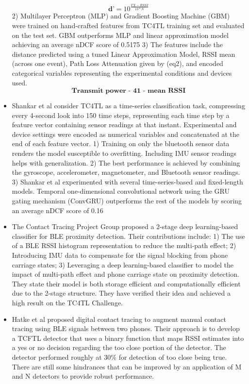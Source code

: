 \documentclass[conference]{IEEEtran}
\begin{document}
\begin{itemize}
\begin{equation} \label{distance_estimate}
{\mathbf{\textbf{d'}} =10^{\frac{{TX - RSSI}}{10*N}}}
\end{equation}
2) Multilayer Perceptron (MLP) and Gradient Boosting Machine (GBM) were trained on hand-crafted features from TC4TL training set and evaluated on the test set. GBM outperforms MLP and linear approximation model achieving an average nDCF score of 0.5175
3) The features include the distance predicted using a tuned Linear Approximation Model, RSSI mean (across one event), Path Loss Attenuation given by (eq2), and encoded categorical variables representing the experimental conditions and devices used.\\ 
\begin{equation} \label{transmit}
{\mathbf{\textbf{Transmit power - 41 - mean RSSI}}}
\end{equation}
\item Shankar et al consider TC4TL as a time-series classification task, compressing every 4-second look into 150 time steps, representing each time step by a feature vector containing sensor readings at that instant. Experimental and device settings were encoded as numerical variables and concatenated at the end of each feature vector. 1) Training on only the bluetooth sensor data renders the model susceptible to overfitting. Including IMU sensor readings helps with generalization. 2) The best performance is achieved by combining the gyroscope, accelerometer, magnetometer, and Bluetooth sensor readings. 3) Shankar et al experimented with several time-series-based and fixed-length models. Temporal one-dimensional convolutional network using the GRU gating mechanism (ConvGRU) outperforms the rest of the models by scoring an average nDCF score of 0.16
\item The Contact Tracing Project Group \cite{b9} proposed a 2-stage deep learning-based classifier for BLE proximity detection. Their contributions include: 1) The use of a BLE RSSI histogram representation to reduce the multi-path effect; 2) Introducing IMU data to compensate for the signal blocking from phone carriage states; 3) Leveraging a deep learning-based classifier to model the impact of multi-path effect and phone carriage state on proximity detection. They state their model is both storage efficient and computationally efficient due to the 2-stage structure. They have verified their idea and achieved a high result on the TC4TL Challenge.
\item Hatke et al\cite{b8} proposed digital contact tracing to augment manual contact tracing using BLE signals between two phones. Their approach is to develop a TCFTL detector that uses a binary function that maps RSSI estimates into a yes or no decision regarding the too close portion of the detector. The detector performed roughly at 30\% for detection of too close being true. There are still some hindrances that can be improved by an application of M and N detectors to provide robust performance.


\end{itemize}
\end{document}
